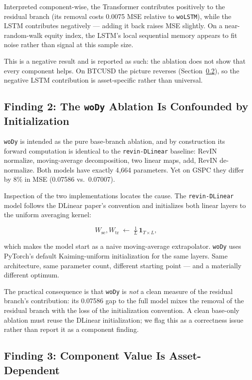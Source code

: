 \documentclass[conference]{IEEEtran}
\begin{document}
Interpreted component-wise, the Transformer contributes positively to the
residual branch (its removal costs 0.0075 MSE relative to \texttt{woLSTM}),
while the LSTM contributes negatively --- adding it back raises MSE slightly.
On a near-random-walk equity index, the LSTM's local sequential memory
appears to fit noise rather than signal at this sample size.

This is a negative result and is reported as such: the ablation does not
show that every component helps. On BTCUSD the picture reverses
(Section~\ref{sec:analysis-C}), so the negative LSTM contribution is
asset-specific rather than universal.

\subsection{Finding 2: The \texttt{woDy} Ablation Is Confounded by Initialization}
\label{sec:analysis-B}

\texttt{woDy} is intended as the pure base-branch ablation, and by
construction its forward computation is identical to the
\texttt{revin-DLinear} baseline: RevIN normalize, moving-average
decomposition, two linear maps, add, RevIN de-normalize. Both models have
exactly 4{,}664 parameters. Yet on GSPC they differ by 8\% in MSE
(0.07586 vs.\ 0.07007).

Inspection of the two implementations locates the cause. The
\texttt{revin-DLinear} model follows the DLinear paper's convention and
initializes both linear layers to the uniform averaging kernel:

\begin{equation}
W_{\text{se}}, W_{\text{tr}} \;\leftarrow\; \tfrac{1}{L}\,\mathbf{1}_{T\times L},
\end{equation}

which makes the model start as a naive moving-average extrapolator.
\texttt{woDy} uses PyTorch's default Kaiming-uniform initialization for the
same layers. Same architecture, same parameter count, different starting
point --- and a materially different optimum.

The practical consequence is that \texttt{woDy} is \emph{not} a clean
measure of the residual branch's contribution: its 0.07586 gap to the full
model mixes the removal of the residual branch with the loss of the
initialization convention. A clean base-only ablation must reuse the
DLinear initialization; we flag this as a correctness issue rather than
report it as a component finding.

\subsection{Finding 3: Component Value Is Asset-Dependent}
\label{sec:analysis-C}
\end{document}
